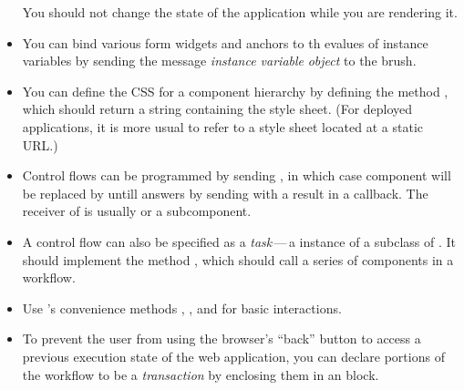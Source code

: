 \documentclass[a4paper,10pt,twoside]{book}
\begin{document}
\begin{itemize}
You should not change the state of the application while you are rendering it.
  \item You can bind various form widgets and anchors to th evalues of instance variables by sending the message  \emph{instance variable}  \emph{object} to the brush.
  \item You can define the CSS for a component hierarchy by defining the method , which should return a string containing the style sheet.
  (For deployed applications, it is more usual to refer to a style sheet located at a static URL.)
  \item Control flows can be programmed by sending , in which case component  will be replaced by  untill  answers by sending  with a result in a callback.
  The receiver of  is usually  or a subcomponent.
  \item A control flow can also be specified as a \emph{task}\,---\,a instance of a subclass of . It should implement the method , which should call a series of components in a workflow.
  \item Use 's convenience methods , ,  and  for basic interactions.
  \item To prevent the user from using the browser's ``back'' button to access a previous execution state of the web application, you can declare portions of the workflow to be a \emph{transaction} by enclosing them in an  block.
\end{itemize}

\ifx\wholebook\relax\else 
   
   
\end{document}
